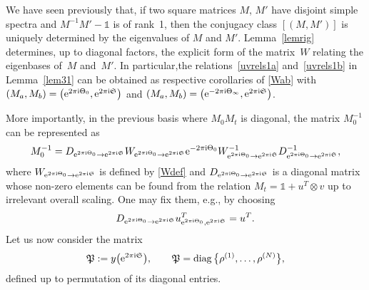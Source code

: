 \documentclass[pdftex]{sigma}
\numberwithin{equation}{section}
\begin{document}
\begin{Remark}We have seen previously that, if two square matrices $M$, $M'$ have disjoint simple spectra and $M^{-1}M'-\mathds 1$ is of rank~1, then the conjugacy class $ [( M,M')]$ is uniquely determined by the eigenvalues of $M$ and $M'$. Lemma~\ref{lemrig} determines, up to diagonal factors, the explicit form of the matrix~$W$ relating the eigenbases of~$M$ and~$M'$. In particular,the relations~\eqref{uvrels1a} and~\eqref{uvrels1b} in Lemma~\ref{lem31} can be obtained as respective corollaries of \eqref{Wab} with $(M_{a},M_{b})=\big({\rm e}^{2\pi{\rm i}\Theta_0},{\rm e}^{2\pi{\rm i}\mathfrak S}\big)$ and $(M_{a},M_{b}) =\big({\rm e}^{-2\pi{\rm i}\Theta_{\infty}},{\rm e}^{2\pi{\rm i}\mathfrak S}\big)$.
\end{Remark}

More importantly, in the previous basis where $M_0M_t$ is diagonal, the matrix $M_0^{-1}$ can be represented as
\begin{gather*}
M_0^{-1}=D_{{\rm e}^{2\pi{\rm i}\Theta_0}\to {\rm e}^{2\pi{\rm i} \mathfrak S}}W_{{\rm e}^{2\pi{\rm i}\Theta_0}\to {\rm e}^{2\pi{\rm i} \mathfrak S}}{\rm e}^{-2\pi{\rm i} \Theta_0}W_{{\rm e}^{2\pi{\rm i}\Theta_0}\to {\rm e}^{2\pi{\rm i} \mathfrak S}}^{-1}D_{{\rm e}^{2\pi{\rm i}\Theta_0}\to {\rm e}^{2\pi{\rm i} \mathfrak S}}^{-1},
\end{gather*}
where $W_{{\rm e}^{2\pi{\rm i}\Theta_0}\to {\rm e}^{2\pi{\rm i} \mathfrak S}}$ is defined by \eqref{Wdef} and $D_{{\rm e}^{2\pi{\rm i}\Theta_0}\to {\rm e}^{2\pi{\rm i} \mathfrak S}}$ is a diagonal matrix whose non-zero elements can be found from the relation $M_t=\mathds 1+u^T\otimes v$ up to irrelevant overall scaling. One may fix them, e.g., by choosing
\begin{gather*}
D_{{\rm e}^{2\pi{\rm i}\Theta_0}\to {\rm e}^{2\pi{\rm i} \mathfrak S}}u_{{\rm e}^{2\pi{\rm i}\Theta_0},{\rm e}^{2\pi{\rm i} \mathfrak S}}^T= u^T.
\end{gather*}
Let us now consider the matrix
\begin{gather*}
\mathfrak P:=y\big({\rm e}^{2\pi{\rm i} \mathfrak S}\big),\qquad \mathfrak P=\operatorname{diag}\big\{\rho^{(1)},\ldots,\rho^{(N)}\big\},
\end{gather*}
defined up to permutation of its diagonal entries.
\end{document}
